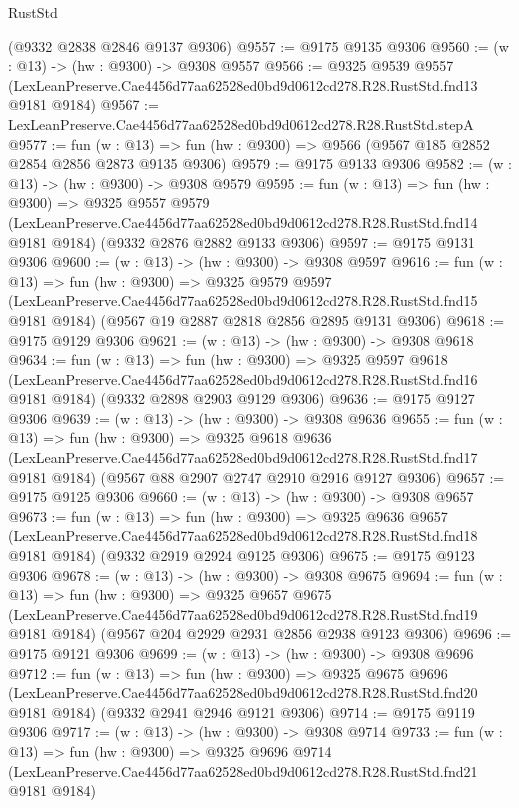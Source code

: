 \begin{lexlean}{RustStd}
\begin{coremodule}
    (@9332 @2838 @2846 @9137 @9306)
@9557 := @9175 @9135 @9306
@9560 := (w : @13) -> (hw : @9300) -> @9308 @9557
@9566 := @9325
    @9539
    @9557
    (LexLeanPreserve.Cae4456d77aa62528ed0bd9d0612cd278.R28.RustStd.fnd13 @9181 @9184)
@9567 := LexLeanPreserve.Cae4456d77aa62528ed0bd9d0612cd278.R28.RustStd.stepA
@9577 := fun (w : @13) => fun (hw : @9300) => @9566 (@9567 @185 @2852 @2854 @2856 @2873 @9135 @9306)
@9579 := @9175 @9133 @9306
@9582 := (w : @13) -> (hw : @9300) -> @9308 @9579
@9595 := fun (w : @13) =>
  fun (hw : @9300) =>
  @9325
    @9557
    @9579
    (LexLeanPreserve.Cae4456d77aa62528ed0bd9d0612cd278.R28.RustStd.fnd14 @9181 @9184)
    (@9332 @2876 @2882 @9133 @9306)
@9597 := @9175 @9131 @9306
@9600 := (w : @13) -> (hw : @9300) -> @9308 @9597
@9616 := fun (w : @13) =>
  fun (hw : @9300) =>
  @9325
    @9579
    @9597
    (LexLeanPreserve.Cae4456d77aa62528ed0bd9d0612cd278.R28.RustStd.fnd15 @9181 @9184)
    (@9567 @19 @2887 @2818 @2856 @2895 @9131 @9306)
@9618 := @9175 @9129 @9306
@9621 := (w : @13) -> (hw : @9300) -> @9308 @9618
@9634 := fun (w : @13) =>
  fun (hw : @9300) =>
  @9325
    @9597
    @9618
    (LexLeanPreserve.Cae4456d77aa62528ed0bd9d0612cd278.R28.RustStd.fnd16 @9181 @9184)
    (@9332 @2898 @2903 @9129 @9306)
@9636 := @9175 @9127 @9306
@9639 := (w : @13) -> (hw : @9300) -> @9308 @9636
@9655 := fun (w : @13) =>
  fun (hw : @9300) =>
  @9325
    @9618
    @9636
    (LexLeanPreserve.Cae4456d77aa62528ed0bd9d0612cd278.R28.RustStd.fnd17 @9181 @9184)
    (@9567 @88 @2907 @2747 @2910 @2916 @9127 @9306)
@9657 := @9175 @9125 @9306
@9660 := (w : @13) -> (hw : @9300) -> @9308 @9657
@9673 := fun (w : @13) =>
  fun (hw : @9300) =>
  @9325
    @9636
    @9657
    (LexLeanPreserve.Cae4456d77aa62528ed0bd9d0612cd278.R28.RustStd.fnd18 @9181 @9184)
    (@9332 @2919 @2924 @9125 @9306)
@9675 := @9175 @9123 @9306
@9678 := (w : @13) -> (hw : @9300) -> @9308 @9675
@9694 := fun (w : @13) =>
  fun (hw : @9300) =>
  @9325
    @9657
    @9675
    (LexLeanPreserve.Cae4456d77aa62528ed0bd9d0612cd278.R28.RustStd.fnd19 @9181 @9184)
    (@9567 @204 @2929 @2931 @2856 @2938 @9123 @9306)
@9696 := @9175 @9121 @9306
@9699 := (w : @13) -> (hw : @9300) -> @9308 @9696
@9712 := fun (w : @13) =>
  fun (hw : @9300) =>
  @9325
    @9675
    @9696
    (LexLeanPreserve.Cae4456d77aa62528ed0bd9d0612cd278.R28.RustStd.fnd20 @9181 @9184)
    (@9332 @2941 @2946 @9121 @9306)
@9714 := @9175 @9119 @9306
@9717 := (w : @13) -> (hw : @9300) -> @9308 @9714
@9733 := fun (w : @13) =>
  fun (hw : @9300) =>
  @9325
    @9696
    @9714
    (LexLeanPreserve.Cae4456d77aa62528ed0bd9d0612cd278.R28.RustStd.fnd21 @9181 @9184)

\end{coremodule}
\end{lexlean}
